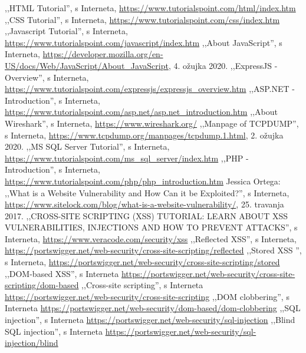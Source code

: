 \documentclass[12pt, oneside, onecolumn]{book}
\begin{document}
{%

\renewcommand{\bibname}{LITERATURA}
\begin{spacing}{1}
\begin{thebibliography}{99}
	 ,,HTML Tutorial'', s Interneta, \url{https://www.tutorialspoint.com/html/index.htm}
	 ,,CSS Tutorial'', s Interneta, \url{https://www.tutorialspoint.com/css/index.htm}
	 ,,Javascript Tutorial'', s Interneta, \url{https://www.tutorialspoint.com/javascript/index.htm}
	 ,,About JavaScript'', s Interneta, \url{https://developer.mozilla.org/en-US/docs/Web/JavaScript/About_JavaScript}, 4. ožujka 2020.
	 ,,ExpressJS - Overview'', s Interneta, \url{https://www.tutorialspoint.com/expressjs/expressjs_overview.htm}
	 ,,ASP.NET - Introduction'', s Interneta, \url{https://www.tutorialspoint.com/asp.net/asp.net_introduction.htm}
	 ,,About Wireshark'', s Interneta, \url{https://www.wireshark.org/}
	 ,,Manpage of TCPDUMP'', s Interneta, \url{https://www.tcpdump.org/manpages/tcpdump.1.html}, 2. ožujka 2020.
	 ,,MS SQL Server Tutorial'', s Interneta, \url{https://www.tutorialspoint.com/ms_sql_server/index.htm}
	 ,,PHP - Introduction'', s Interneta, \url{https://www.tutorialspoint.com/php/php_introduction.htm}
	 Jessica Ortega: ,,What is a Website Vulnerability and How Can it be Exploited?'', s Interneta, \url{https://www.sitelock.com/blog/what-is-a-website-vulnerability/}, 25. travanja 2017.
	 ,,CROSS-SITE SCRIPTING (XSS) TUTORIAL: LEARN ABOUT XSS VULNERABILITIES, INJECTIONS AND HOW TO PREVENT ATTACKS'', s Interneta, \url{https://www.veracode.com/security/xss}
	 ,,Reflected XSS'', s Interneta, \url{https://portswigger.net/web-security/cross-site-scripting/reflected}
	 ,,Stored XSS '', s Interneta, \url{https://portswigger.net/web-security/cross-site-scripting/stored}
	 ,,DOM-based XSS'', s Interneta \url{https://portswigger.net/web-security/cross-site-scripting/dom-based}
	 ,,Cross-site scripting'', s Interneta \url{https://portswigger.net/web-security/cross-site-scripting}
	 ,,DOM clobbering'', s Interneta \url{https://portswigger.net/web-security/dom-based/dom-clobbering}
	 ,,SQL injection'', s Interneta \url{https://portswigger.net/web-security/sql-injection}
	 ,,Blind SQL injection'', s Interneta \url{https://portswigger.net/web-security/sql-injection/blind}

\end{thebibliography}
\end{spacing}}
\end{document}
